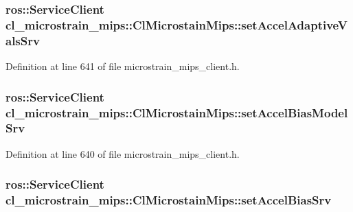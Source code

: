 \subsubsection[{\texorpdfstring{set\+Accel\+Adaptive\+Vals\+Srv}{setAccelAdaptiveValsSrv}}]{\setlength{\rightskip}{0pt plus 5cm}ros\+::\+Service\+Client cl\+\_\+microstrain\+\_\+mips\+::\+Cl\+Microstain\+Mips\+::set\+Accel\+Adaptive\+Vals\+Srv\hspace{0.3cm}{\ttfamily [protected]}}\hypertarget{classcl__microstrain__mips_1_1ClMicrostainMips_a0e22727b68e51261aa65605f236419e6}{}\label{classcl__microstrain__mips_1_1ClMicrostainMips_a0e22727b68e51261aa65605f236419e6}


Definition at line 641 of file microstrain\+\_\+mips\+\_\+client.\+h.

\subsubsection[{\texorpdfstring{set\+Accel\+Bias\+Model\+Srv}{setAccelBiasModelSrv}}]{\setlength{\rightskip}{0pt plus 5cm}ros\+::\+Service\+Client cl\+\_\+microstrain\+\_\+mips\+::\+Cl\+Microstain\+Mips\+::set\+Accel\+Bias\+Model\+Srv\hspace{0.3cm}{\ttfamily [protected]}}\hypertarget{classcl__microstrain__mips_1_1ClMicrostainMips_a8d7c0f0a94dd6a25cac0130f8d9f55ff}{}\label{classcl__microstrain__mips_1_1ClMicrostainMips_a8d7c0f0a94dd6a25cac0130f8d9f55ff}


Definition at line 640 of file microstrain\+\_\+mips\+\_\+client.\+h.

\subsubsection[{\texorpdfstring{set\+Accel\+Bias\+Srv}{setAccelBiasSrv}}]{\setlength{\rightskip}{0pt plus 5cm}ros\+::\+Service\+Client cl\+\_\+microstrain\+\_\+mips\+::\+Cl\+Microstain\+Mips\+::set\+Accel\+Bias\+Srv\hspace{0.3cm}{\ttfamily [protected]}}\hypertarget{classcl__microstrain__mips_1_1ClMicrostainMips_ae2ea11655cba06e49307780d1f95e197}{}\label{classcl__microstrain__mips_1_1ClMicrostainMips_ae2ea11655cba06e49307780d1f95e197}


